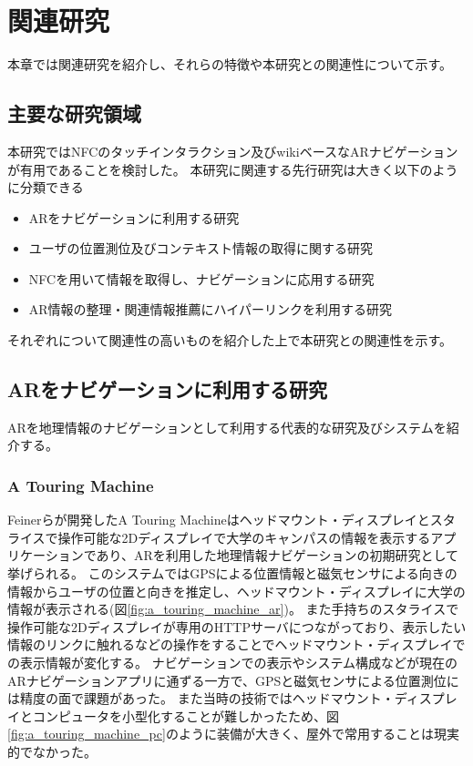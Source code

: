 \chapter{関連研究}
\label{chap:relatedResearch}

本章では関連研究を紹介し、それらの特徴や本研究との関連性について示す。

\newpage


\section{主要な研究領域}
本研究ではNFCのタッチインタラクション及びwikiベースなARナビゲーションが有用であることを検討した。
本研究に関連する先行研究は大きく以下のように分類できる
\begin{itemize}
  \item ARをナビゲーションに利用する研究
  \item ユーザの位置測位及びコンテキスト情報の取得に関する研究
  \item NFCを用いて情報を取得し、ナビゲーションに応用する研究
  \item AR情報の整理・関連情報推薦にハイパーリンクを利用する研究
\end{itemize}
それぞれについて関連性の高いものを紹介した上で本研究との関連性を示す。

\section{ARをナビゲーションに利用する研究}
ARを地理情報のナビゲーションとして利用する代表的な研究及びシステムを紹介する。

\subsection{A Touring Machine}
Feinerらが開発したA Touring Machine\cite{629922}はヘッドマウント・ディスプレイとスタライスで操作可能な2Dディスプレイで大学のキャンパスの情報を表示するアプリケーションであり、ARを利用した地理情報ナビゲーションの初期研究として挙げられる。
このシステムではGPSによる位置情報と磁気センサによる向きの情報からユーザの位置と向きを推定し、ヘッドマウント・ディスプレイに大学の情報が表示される(図\ref{fig:a_touring_machine_ar})。
また手持ちのスタライスで操作可能な2Dディスプレイが専用のHTTPサーバにつながっており、表示したい情報のリンクに触れるなどの操作をすることでヘッドマウント・ディスプレイでの表示情報が変化する。
ナビゲーションでの表示やシステム構成などが現在のARナビゲーションアプリに通ずる一方で、GPSと磁気センサによる位置測位には精度の面で課題があった。
また当時の技術ではヘッドマウント・ディスプレイとコンピュータを小型化することが難しかったため、図\ref{fig:a_touring_machine_pc}のように装備が大きく、屋外で常用することは現実的でなかった。

